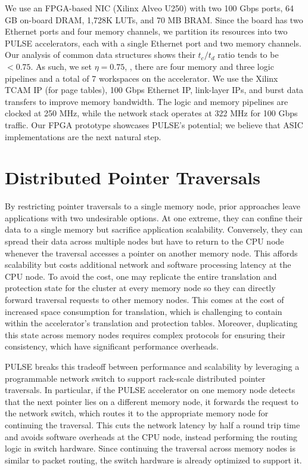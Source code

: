  We use an FPGA-based NIC (Xilinx Alveo U250) with two 100 Gbps ports, 64 GB on-board DRAM, 1,728K LUTs, and 70 MB BRAM. Since the board has two Ethernet ports and four memory channels, we partition its resources into two PULSE accelerators, each with a single Ethernet port and two memory channels. Our analysis of common data structures shows their $t_c/t_d$ ratio tends to be $<0.75$. As such, we set $\eta=0.75$, \ie, there are four memory and three logic pipelines and a total of 7 workspaces on the accelerator. We use the Xilinx TCAM IP (for page tables), 100 Gbps Ethernet IP, link-layer IPs, and burst data transfers to improve memory bandwidth. The logic and memory pipelines are clocked at 250 MHz, while the network stack operates at 322 MHz for 100 Gbps traffic. Our FPGA prototype showcases PULSE's potential; we believe that ASIC implementations are the next natural step.

\section{Distributed Pointer Traversals}

By restricting pointer traversals to a single memory node, prior approaches leave applications with two undesirable options. At one extreme, they can confine their data to a single memory but sacrifice application scalability. Conversely, they can spread their data across multiple nodes but have to return to the CPU node whenever the traversal accesses a pointer on another memory node. This affords scalability but costs additional network and software processing latency at the CPU node. To avoid the cost, one may replicate the entire translation and protection state for the cluster at every memory node so they can directly forward traversal requests to other memory nodes. This comes at the cost of increased space consumption for translation, which is challenging to contain within the accelerator's translation and protection tables. Moreover, duplicating this state across memory nodes requires complex protocols for ensuring their consistency, which have significant performance overheads.

PULSE breaks this tradeoff between performance and scalability by leveraging a programmable network switch to support rack-scale distributed pointer traversals. In particular, if the PULSE accelerator on one memory node detects that the next pointer lies on a different memory node, it forwards the request to the network switch, which routes it to the appropriate memory node for continuing the traversal. This cuts the network latency by half a round trip time and avoids software overheads at the CPU node, instead performing the routing logic in switch hardware. Since continuing the traversal across memory nodes is similar to packet routing, the switch hardware is already optimized to support it.

